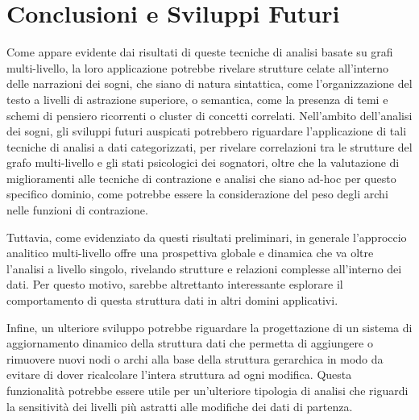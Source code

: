\chapter*{Conclusioni e Sviluppi Futuri}

Come appare evidente dai risultati di queste tecniche di analisi basate su grafi multi-livello, la loro applicazione
potrebbe rivelare strutture celate all'interno delle narrazioni dei sogni, che siano di natura sintattica, come
l'organizzazione del testo a livelli di astrazione superiore, o semantica, come la presenza di temi e schemi di
pensiero ricorrenti o cluster di concetti correlati.
Nell'ambito dell'analisi dei sogni, gli sviluppi futuri auspicati potrebbero riguardare l'applicazione di tali
tecniche di analisi a dati categorizzati, per rivelare correlazioni tra le strutture del grafo multi-livello
e gli stati psicologici dei sognatori, oltre che la valutazione di miglioramenti alle tecniche di contrazione e
analisi che siano ad-hoc per questo specifico dominio, come potrebbe essere la considerazione del peso degli archi
nelle funzioni di contrazione.

Tuttavia, come evidenziato da questi risultati preliminari, in generale l'approccio analitico multi-livello offre
una prospettiva globale e dinamica che va oltre l'analisi a livello singolo, rivelando strutture e relazioni complesse
all'interno dei dati.
Per questo motivo, sarebbe altrettanto interessante esplorare il comportamento di questa struttura dati in altri
domini applicativi.

Infine, un ulteriore sviluppo potrebbe riguardare la progettazione di un sistema di aggiornamento dinamico
della struttura dati che permetta di aggiungere o rimuovere nuovi nodi o archi alla base della struttura
gerarchica in modo da evitare di dover ricalcolare l'intera struttura ad ogni modifica.
Questa funzionalità potrebbe essere utile per un'ulteriore tipologia di analisi che riguardi la
sensitività dei livelli più astratti alle modifiche dei dati di partenza.
